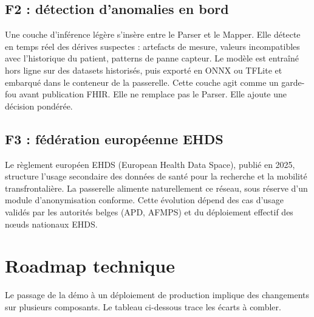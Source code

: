 \subsection{F2 : détection d'anomalies en bord}
\label{sec:roadmap-f2}

Une couche d'inférence légère s'insère entre le Parser et le Mapper. Elle détecte en temps réel des dérives suspectes : artefacts de mesure, valeurs incompatibles avec l'historique du patient, patterns de panne capteur. Le modèle est entraîné hors ligne sur des datasets historisés, puis exporté en ONNX ou TFLite et embarqué dans le conteneur de la passerelle. Cette couche agit comme un garde-fou avant publication FHIR. Elle ne remplace pas le Parser. Elle ajoute une décision pondérée.

\subsection{F3 : fédération européenne EHDS}
\label{sec:roadmap-f3}

Le règlement européen EHDS (European Health Data Space), publié en 2025, structure l'usage secondaire des données de santé pour la recherche et la mobilité transfrontalière. La passerelle alimente naturellement ce réseau, sous réserve d'un module d'anonymisation conforme. Cette évolution dépend des cas d'usage validés par les autorités belges (APD, AFMPS) et du déploiement effectif des n\oe uds nationaux EHDS.

\section{Roadmap technique}
\label{sec:roadmap-technique}

Le passage de la démo à un déploiement de production implique des changements sur plusieurs composants. Le tableau ci-dessous trace les écarts à combler.

